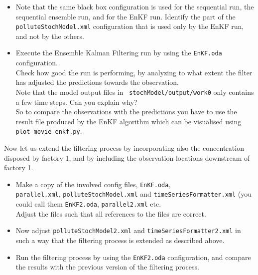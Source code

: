 \begin{itemize}
 \item Note that the same black box configuration is used for the sequential
   run, the sequential ensemble run, and for the EnKF run. Identify the part of
   the {\tt polluteStochModel.xml} configuration that is used only by the EnKF
   run, and not by the others.
 \item Execute the Ensemble Kalman Filtering run by using the {\tt EnKF.oda}
   configuration.\\ Check how good the run is performing, by analyzing to what
   extent the filter has adjusted the predictions towards the
   observation.\\ Note that the model output files in {\tt
     stochModel/output/work0} only contains a few time steps. Can you explain
   why?\\ So to compare the observations with the predictions you have to use
   the result file produced by the EnKF algorithm which can be visualised using
   {\tt plot\_movie\_enkf.py}.
\end{itemize}

Now let us extend the filtering process by incorporating also the concentration
disposed by factory 1, and by including the observation locations downstream of
factory 1.

\begin{itemize}
	\item Make a copy of the involved config files, {\tt EnKF.oda},\\ 
		{\tt parallel.xml}, {\tt polluteStochModel.xml} and
		{\tt timeSeriesFormatter.xml} (you could call them
		{\tt EnKF2.oda}, {\tt parallel2.xml} etc.
		\\ Adjust the files such that all references to the files are correct.
	\item Now adjust {\tt polluteStochModel2.xml} and {\tt timeSeriesFormatter2.xml}
	      in such a way that the filtering process is extended as described above.
 \item Run the filtering process by using the {\tt EnKF2.oda} configuration,
   and compare the results with the previous version of the filtering process.
\end{itemize}

